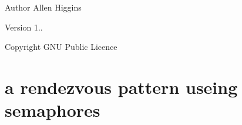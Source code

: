 \begin{DoxyAuthor}{Author}
Allen Higgins 
\end{DoxyAuthor}
\begin{DoxyVersion}{Version}
1.. 
\end{DoxyVersion}
\begin{DoxyCopyright}{Copyright}
G\+NU Public Licence
\end{DoxyCopyright}
\hypertarget{index_create}{}\section{a rendezvous pattern useing semaphores}\label{index_create}
